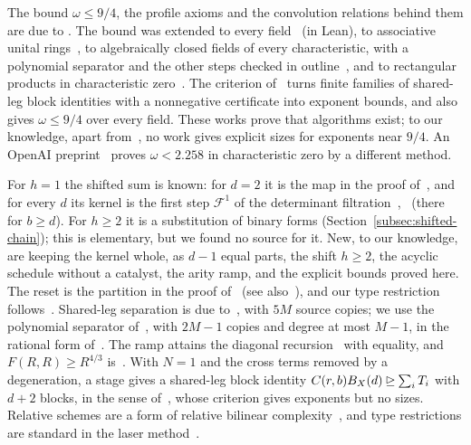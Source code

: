 The bound \(\omega\le9/4\), the profile axioms and the convolution
relations behind them are due to \citet{OAI26}. The bound was extended
to every field~\citep{Nav26a,Zui26} (in Lean), to associative unital
rings~\citep{Nav26b}, to algebraically closed fields of every
characteristic, with a polynomial separator and the other steps checked
in outline~\citep{Lu26}, and to rectangular products in characteristic
zero~\citep{Uzn26}. The criterion of~\citet{Fil26} turns finite
families of shared-leg block identities with a nonnegative certificate
into exponent bounds, and also gives \(\omega\le9/4\) over every field.
These works prove that algorithms exist; to our knowledge, apart from~\citep{FinCon26}, no work gives
explicit sizes for exponents near \(9/4\). An OpenAI
preprint~\citep{OAI26Comp} proves \(\omega<2.258\) in characteristic
zero by a different method.

For \(h=1\) the shifted sum is known: for \(d=2\) it is the map in the
proof of~\citep[Lemma~4.1]{OAI26}, and for every \(d\) its kernel is the
first step \(\mathcal F^1\) of the determinant
filtration~\citep[Lemma~2.5]{Maakestad23},~\citep[Section~4.1]{FinCon26}
(there for \(b\ge d\)).
For \(h\ge2\) it is a substitution of binary forms
(Section~\ref{subsec:shifted-chain}); this is elementary, but we found
no source for it. New, to our knowledge, are keeping the kernel whole,
as \(d-1\) equal parts, the shift \(h\ge2\), the acyclic schedule
without a catalyst, the arity ramp, and the explicit bounds proved
here. The reset is
the partition in the proof of~\citep[Lemma~4.2]{OAI26} (see
also~\citep[Lemma~2.1(3)]{Uzn26}), and our type restriction
follows~\citep[Lemma~4.3]{FinCon26}. Shared-leg separation is due
to~\citet[Proposition~3.1]{OAI26}, with \(5M\) source copies; we use the
polynomial separator of~\citet[Proposition~2.1]{Lu26}, with \(2M-1\)
copies and degree at most \(M-1\), in the rational form
of~\citep[Lemma~9.1(b)]{FinCon26}. The ramp attains the diagonal
recursion~\citep[(5.1)]{OAI26} with equality, and
\(F(R,R)\ge R^{4/3}\) is~\citep[Lemma~5.1]{OAI26}. With \(N=1\) and the
cross terms removed by a degeneration, a stage gives a shared-leg block
identity \(C(r,b)B_X(d)\unrhd\sum_iT_i\) with \(d+2\) blocks, in the
sense of~\citet[Theorem~1.1, identity~(1.2)]{Fil26}, whose criterion
gives exponents but no sizes. Relative schemes are a form of relative
bilinear complexity~\citep{Str87}, and type restrictions are standard
in the laser method~\citep{Str87,CW90}.
